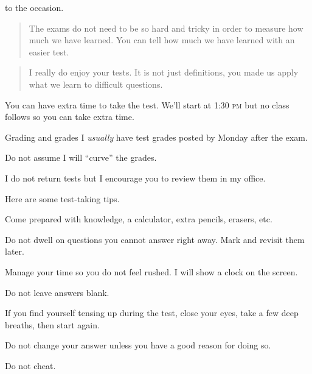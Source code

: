 \documentclass[t]{beamer}
\begin{document}
\begin{frame}{ to the occasion.}
%
	\hangpara \begin{quote}The exams do not need to be so hard and tricky in order to measure how much we have learned. You can tell how much we have learned with an easier test.
	\end{quote}
%
	\hangpara \begin{quote}I really do enjoy your tests. It is not just definitions, you made us apply what we learn to difficult questions.
	\end{quote}
%
\end{frame}

%
%
%

\begin{frame}{You can have extra time to take the test.}
\hangpara We'll start at 1:30 \textsc{pm} but no class follows so you can take extra time.
\end{frame}

\begin{frame}{Grading and grades}
\hangpara I \emph{usually} have test grades posted by Monday after the exam.

\hangpara Do not assume I will “curve” the grades. 

\hangpara I do not return tests but I encourage you to review them in my office.
\end{frame}

\begin{frame}{Here are some test-taking tips.}

\hangpara Come prepared with knowledge, a calculator, extra pencils, erasers, etc.

\hangpara Do not dwell on questions you cannot answer right away. Mark and revisit them later.

\hangpara Manage your time so you do not feel rushed. I will show a clock on the screen.

\hangpara Do not leave answers blank.

\hangpara If you find yourself tensing up during the test, close your eyes, take a few deep breaths, then start again. 

\hangpara Do not change your answer unless you have a good reason for doing so.

\hangpara Do not cheat.

\end{frame}
\end{document}

